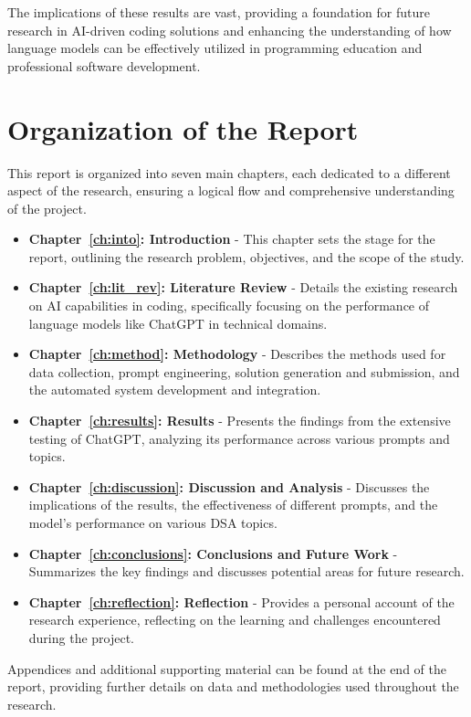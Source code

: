 The implications of these results are vast, providing a foundation for future research in AI-driven coding solutions and enhancing the understanding of how language models can be effectively utilized in programming education and professional software development.

\section{Organization of the Report}
\label{sec:intro_org}
This report is organized into seven main chapters, each dedicated to a different aspect of the research, ensuring a logical flow and comprehensive understanding of the project.

\begin{itemize}
    \item \textbf{Chapter~\ref{ch:into}: Introduction} - This chapter sets the stage for the report, outlining the research problem, objectives, and the scope of the study.
    \item \textbf{Chapter~\ref{ch:lit_rev}: Literature Review} - Details the existing research on AI capabilities in coding, specifically focusing on the performance of language models like ChatGPT in technical domains.
    \item \textbf{Chapter~\ref{ch:method}: Methodology} - Describes the methods used for data collection, prompt engineering, solution generation and submission, and the automated system development and integration.
    \item \textbf{Chapter~\ref{ch:results}: Results} - Presents the findings from the extensive testing of ChatGPT, analyzing its performance across various prompts and topics.
    \item \textbf{Chapter~\ref{ch:discussion}: Discussion and Analysis} - Discusses the implications of the results, the effectiveness of different prompts, and the model's performance on various DSA topics.
    \item \textbf{Chapter~\ref{ch:conclusions}: Conclusions and Future Work} - Summarizes the key findings and discusses potential areas for future research.
    \item \textbf{Chapter~\ref{ch:reflection}: Reflection} - Provides a personal account of the research experience, reflecting on the learning and challenges encountered during the project.
\end{itemize}

Appendices and additional supporting material can be found at the end of the report, providing further details on data and methodologies used throughout the research.


